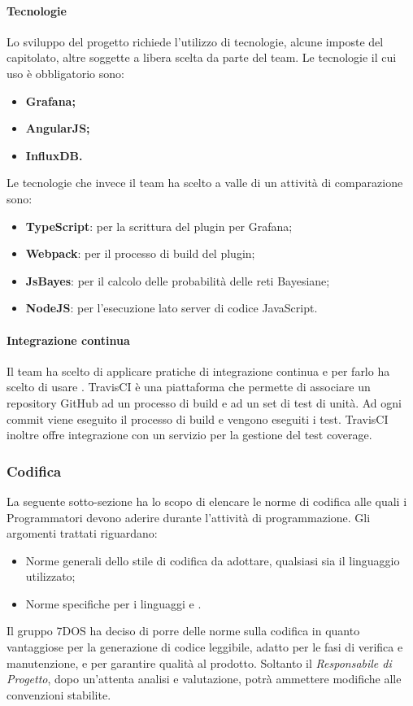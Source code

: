 \paragraph{Tecnologie}\Spazio
Lo sviluppo del progetto richiede l'utilizzo di tecnologie, alcune imposte del capitolato, altre soggette a libera scelta da parte del team.
Le tecnologie il cui uso è obbligatorio sono:
\begin{itemize}
\item\textbf{{Grafana;}}
\item\textbf{{AngularJS;}}
\item\textbf{{InfluxDB.}}
\end{itemize}
Le tecnologie che invece il team ha scelto a valle di un attività di comparazione sono:
\begin{itemize}
\item\textbf{{TypeScript}}: per la scrittura del plugin per Grafana;
\item\textbf{{Webpack}}: per il processo di build del plugin;
\item\textbf{{JsBayes}}: per il calcolo delle probabilità delle reti Bayesiane;
\item\textbf{{NodeJS}}: per l'esecuzione lato server di codice JavaScript.
\end{itemize}
\paragraph{Integrazione continua}\Spazio
Il team ha scelto di applicare pratiche di integrazione continua e per farlo ha scelto di usare .
TravisCI è una piattaforma che permette di associare un repository GitHub ad un processo di build e ad un set di test di unità.
Ad ogni commit viene eseguito il processo di build e vengono eseguiti i test. TravisCI inoltre offre integrazione con  un
servizio per la gestione del test coverage.
\subsubsection{Codifica}
La seguente sotto-sezione ha lo scopo di elencare le norme di codifica alle quali i Programmatori devono aderire durante l'attività di programmazione. Gli argomenti trattati riguardano:
\begin{itemize}
 \item{Norme generali dello stile di codifica da adottare, qualsiasi sia il linguaggio utilizzato;}
 \item{Norme specifiche per i linguaggi    e .}
\end{itemize}
Il gruppo 7DOS ha deciso di porre delle norme sulla codifica in quanto vantaggiose per la generazione di codice leggibile, adatto per le fasi di verifica e manutenzione, e per garantire qualità al prodotto.
Soltanto il \emph{Responsabile di Progetto}, dopo un'attenta analisi e valutazione, potrà ammettere modifiche alle convenzioni stabilite.\\
